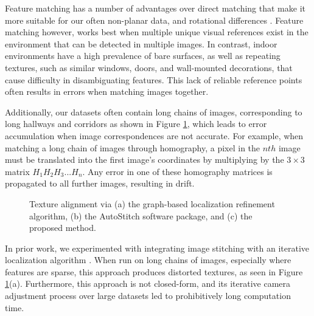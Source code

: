 \documentclass[]{spie}  %
\begin{document}
Feature matching has a number of advantages over direct matching that
make it more suitable for our often non-planar data, and rotational
differences \cite{szeliski2006image}. Feature matching however, works
best when multiple unique visual references exist in the environment
that can be detected in multiple images. In contrast, indoor
environments have a high prevalence of bare surfaces, as well as
repeating textures, such as similar windows, doors, and wall-mounted
decorations, that cause difficulty in disambiguating features. This
lack of reliable reference points often results in errors when
matching images together.

Additionally, our datasets often contain long chains of images,
corresponding to long hallways and corridors as shown in Figure
\ref{fig:mosaic3D}, which leads to error accumulation when image
correspondences are not accurate. For example, when matching a long
chain of images through homography, a pixel in the $nth$ image must be
translated into the first image's coordinates by multiplying by the
$3\times3$ matrix $H_1 H_2 H_3 ... H_n$. Any error in one of these
homography matrices is propagated to all further images, resulting in
drift.

\begin{figure}
  \centering

  \centering

  \centering {}

  \caption{Texture alignment via (a) the graph-based localization
    refinement algorithm, (b) the AutoStitch software package, and (c)
    the proposed method.}
  \label{fig:mosaic3D}
\end{figure}


In prior work, we experimented with integrating image stitching with
an iterative localization algorithm \cite{liu2010indoor}. When run on
long chains of images, especially where features are sparse, this
approach produces distorted textures, as seen in Figure
\ref{fig:mosaic3D}(a). Furthermore, this approach is not closed-form,
and its iterative camera adjustment process over large datasets led to
prohibitively long computation time.
\end{document}
